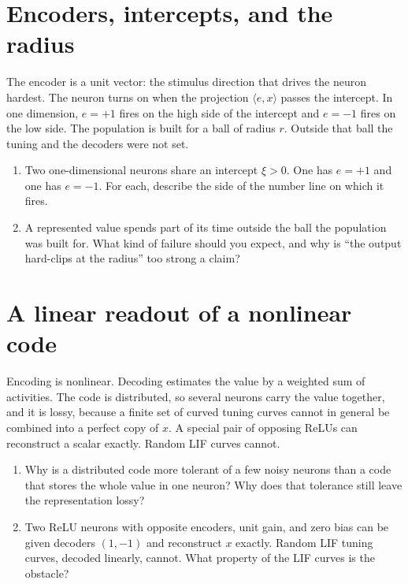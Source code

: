 \documentclass[11pt,letterpaper]{article}
\begin{document}
\section{Encoders, intercepts, and the radius}

\begin{idea}
The encoder is a unit vector: the stimulus direction that drives the neuron hardest. The neuron turns on when the projection \(\langle e, x\rangle\) passes the intercept. In one dimension, \(e = +1\) fires on the high side of the intercept and \(e = -1\) fires on the low side. The population is built for a ball of radius \(r\). Outside that ball the tuning and the decoders were not set.
\end{idea}

\begin{enumerate}
\item Two one-dimensional neurons share an intercept \(\xi > 0\). One has \(e = +1\) and one has \(e = -1\). For each, describe the side of the number line on which it fires.
\item A represented value spends part of its time outside the ball the population was built for. What kind of failure should you expect, and why is ``the output hard-clips at the radius'' too strong a claim?
\end{enumerate}

\section{A linear readout of a nonlinear code}

\begin{idea}
Encoding is nonlinear. Decoding estimates the value by a weighted sum of activities. The code is distributed, so several neurons carry the value together, and it is lossy, because a finite set of curved tuning curves cannot in general be combined into a perfect copy of \(x\). A special pair of opposing ReLUs can reconstruct a scalar exactly. Random LIF curves cannot.
\end{idea}

\begin{enumerate}
\item Why is a distributed code more tolerant of a few noisy neurons than a code that stores the whole value in one neuron? Why does that tolerance still leave the representation lossy?
\item Two ReLU neurons with opposite encoders, unit gain, and zero bias can be given decoders \((1, -1)\) and reconstruct \(x\) exactly. Random LIF tuning curves, decoded linearly, cannot. What property of the LIF curves is the obstacle?
\end{enumerate}
\end{document}
